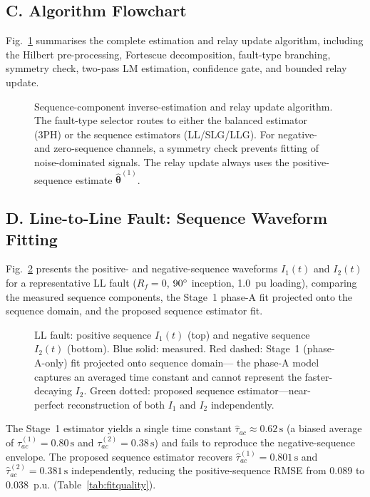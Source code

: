 \documentclass[10pt,journal,twoside]{IEEEtran}
\newcommand{\sss}{\,\text{s}}
\begin{document}
\subsection{C. Algorithm Flowchart}
\label{sec:results:flow}

Fig.~\ref{fig:flowchart} summarises the complete estimation and relay
update algorithm, including the Hilbert pre-processing, Fortescue
decomposition, fault-type branching, symmetry check, two-pass LM
estimation, confidence gate, and bounded relay update.

\begin{figure}[!t]
\centering

\caption{Sequence-component inverse-estimation and relay update algorithm.
  The fault-type selector routes to either the balanced estimator (3PH)
  or the sequence estimators (LL/SLG/LLG).  For negative- and
  zero-sequence channels, a symmetry check prevents fitting of
  noise-dominated signals.  The relay update always uses the
  positive-sequence estimate $\hat{\bm\theta}^{(1)}$.}
\label{fig:flowchart}
\end{figure}

\subsection{D. Line-to-Line Fault: Sequence Waveform Fitting}
\label{sec:results:ll}

Fig.~\ref{fig:ll_waveforms} presents the positive- and negative-sequence
waveforms $I_1(t)$ and $I_2(t)$ for a representative LL fault
($R_f = 0$, $90\degree$ inception, 1.0~pu loading), comparing the measured
sequence components, the Stage~1 phase-A fit projected onto the sequence
domain, and the proposed sequence estimator fit.

\begin{figure}[!t]
\centering

\caption{LL fault: positive sequence $I_1(t)$ (top) and negative sequence
  $I_2(t)$ (bottom).
  Blue solid: measured.
  Red dashed: Stage~1 (phase-A-only) fit projected onto sequence domain---
  the phase-A model captures an averaged time constant and cannot represent
  the faster-decaying $I_2$.
  Green dotted: proposed sequence estimator---near-perfect reconstruction
  of both $I_1$ and $I_2$ independently.}
\label{fig:ll_waveforms}
\end{figure}

\noindent
The Stage~1 estimator yields a single time constant $\hat{\tau}_{ac}
\approx 0.62\sss$ (a biased average of $\tau_{ac}^{(1)} = 0.80\sss$ and
$\tau_{ac}^{(2)} = 0.38\sss$) and fails to reproduce the negative-sequence
envelope.  The proposed sequence estimator recovers
$\hat{\tau}_{ac}^{(1)} = 0.801\sss$ and
$\hat{\tau}_{ac}^{(2)} = 0.381\sss$ independently,
reducing the positive-sequence RMSE from 0.089 to 0.038~p.u.
(Table~\ref{tab:fitquality}).
\end{document}
